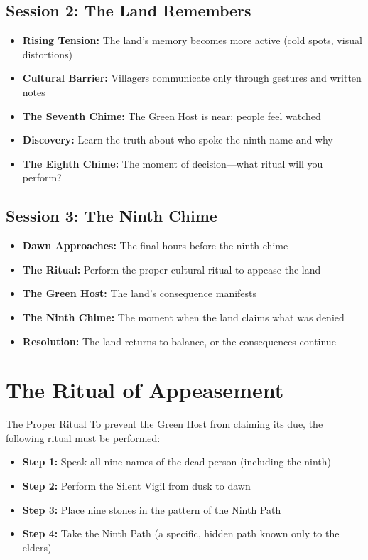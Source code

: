 \documentclass[11pt]{article}
\begin{document}
\subsection*{Session 2: The Land Remembers}
\begin{itemize}
    \item \textbf{Rising Tension:} The land's memory becomes more active (cold spots, visual distortions)
    \item \textbf{Cultural Barrier:} Villagers communicate only through gestures and written notes
    \item \textbf{The Seventh Chime:} The Green Host is near; people feel watched
    \item \textbf{Discovery:} Learn the truth about who spoke the ninth name and why
    \item \textbf{The Eighth Chime:} The moment of decision---what ritual will you perform?
\end{itemize}

\subsection*{Session 3: The Ninth Chime}
\begin{itemize}
    \item \textbf{Dawn Approaches:} The final hours before the ninth chime
    \item \textbf{The Ritual:} Perform the proper cultural ritual to appease the land
    \item \textbf{The Green Host:} The land's consequence manifests
    \item \textbf{The Ninth Chime:} The moment when the land claims what was denied
    \item \textbf{Resolution:} The land returns to balance, or the consequences continue
\end{itemize}

\section*{The Ritual of Appeasement}

\begin{mechanicsbox}{The Proper Ritual}
To prevent the Green Host from claiming its due, the following ritual must be performed:
\begin{itemize}
    \item \textbf{Step 1:} Speak all nine names of the dead person (including the ninth)
    \item \textbf{Step 2:} Perform the Silent Vigil from dusk to dawn
    \item \textbf{Step 3:} Place nine stones in the pattern of the Ninth Path
    \item \textbf{Step 4:} Take the Ninth Path (a specific, hidden path known only to the elders)
\end{itemize}
\end{mechanicsbox}
\end{document}

